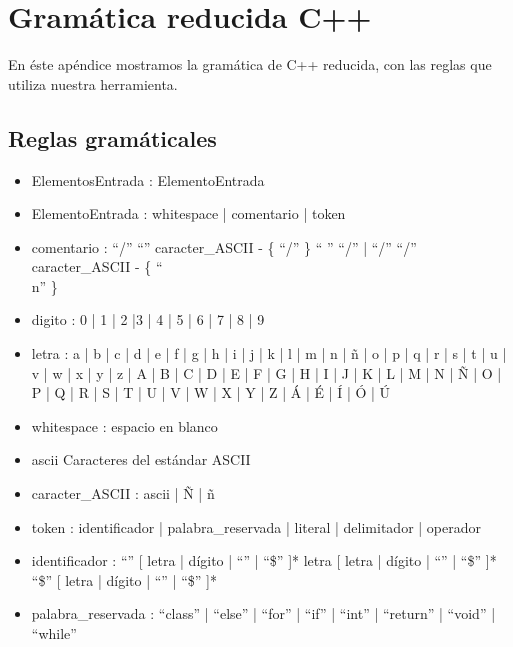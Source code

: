 %
%

\chapter{Gram\'atica reducida C++}

En \'este ap\'endice mostramos la gram\'atica de C++ reducida, con las reglas que utiliza nuestra herramienta.

\section{Reglas gram\'aticales}

\begin{itemize}
\item ElementosEntrada : ElementoEntrada
\item ElementoEntrada : whitespace | comentario | token
\item comentario : ``/'' ``'' caracter\_ASCII - \{ ``/'' \} `` '' ``/'' | ``/'' ``/'' caracter\_ASCII - \{ ``\\n'' \}
\item digito : 0 | 1 | 2 |3 | 4 | 5 | 6 | 7 | 8 | 9
\item letra : a | b | c | d | e | f | g | h | i | j | k | l | m | n | \~n | o | p | q | r | s | t | u | v | w | x | y | z | A | B | C | D | E | F | G | H | I | J | K | L | M | N | \~N | O | P | Q | R | S | T | U | V | W | X | Y | Z | \'A | \'E | \'I | \'O | \'U
\item whitespace : espacio en blanco
\item ascii Caracteres del est\'andar ASCII
\item caracter\_ASCII : ascii | \~N | \~n
\item token : identificador | palabra\_reservada | literal | delimitador | operador
\item identificador : ``'' [ letra | d\'igito | ``'' | ``\$'' ]* letra [ letra | d\'igito | ``'' | ``\$'' ]* ``\$'' [ letra | d\'igito | ``'' | ``\$'' ]*
\item palabra\_reservada : ``class'' | ``else'' | ``for'' | ``if'' | ``int'' | ``return'' | ``void'' | ``while''
\end{itemize}

